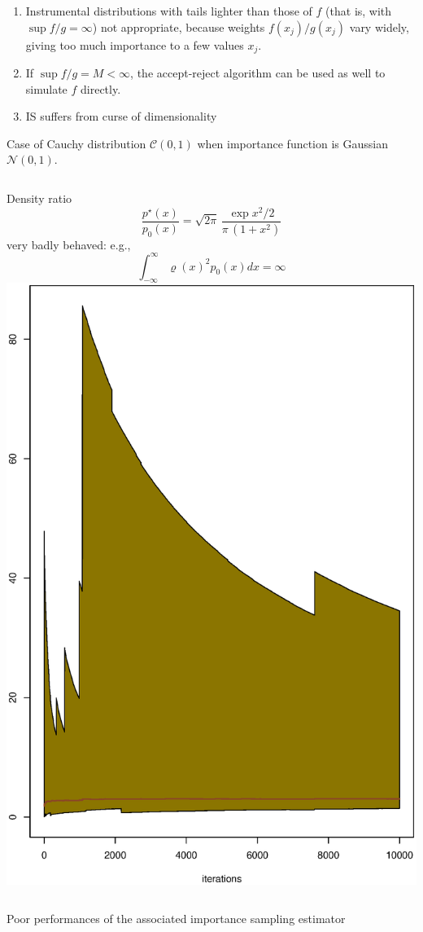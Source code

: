 \begin{slide}
\begin{enumerate}
\pause
\item Instrumental distributions with tails
lighter than those of $f$ (that is, with $\sup f/g = \infty$)
not appropriate, because weights $f(x_j)/g(x_j)$ vary widely,
giving too much importance to a few values $x_j$.

\pause
\item If $\sup f/g = M < \infty$, the accept-reject algorithm
can be used as well to simulate $f$ directly.

\pause
\item IS suffers from curse of dimensionality
\end{enumerate}


\end{slide}\begin{slide}
Case of Cauchy distribution $\mathcal{C}(0,1)$ when importance function is 
Gaussian $\mathscr{N}(0,1)$. 
\begin{columns}
Density ratio 
$$
\frac{p^\star(x)}{p_0(x)}
= \sqrt{2\pi}\,\frac{\exp x^2/2}{\pi\,(1+x^2)}
$$
very badly behaved: e.g.,
$$
\int_{-\infty}^{\infty} \varrho(x)^2 p_0(x) dx = \infty
$$
\includegraphics[height=3.5truecm,width=.9\textwidth]{figures/impinf}
\end{columns}

Poor performances of the
associated importance sampling estimator 
\fin

\end{slide}
